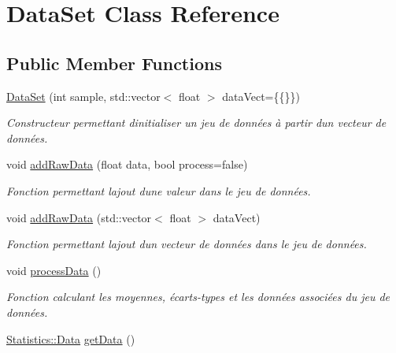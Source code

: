\hypertarget{classDataSet}{}\section{Data\+Set Class Reference}
\label{classDataSet}
\subsection*{Public Member Functions}
\begin{DoxyCompactItemize}
\item 
\hyperlink{classDataSet_ab45c95dc19f12a9217c0f3da7ac92b6a}{Data\+Set} (int sample, std\+::vector$<$ float $>$ data\+Vect=\{\{\}\})
\begin{DoxyCompactList}\small\item\em Constructeur permettant d\textquotesingle{}initialiser un jeu de données à partir d\textquotesingle{}un vecteur de données. \end{DoxyCompactList}\item 
void \hyperlink{classDataSet_ac2453c8cd424ed33b941363a45c009f8}{add\+Raw\+Data} (float data, bool process=false)
\begin{DoxyCompactList}\small\item\em Fonction permettant l\textquotesingle{}ajout d\textquotesingle{}une valeur dans le jeu de données. \end{DoxyCompactList}\item 
void \hyperlink{classDataSet_a71cfe353100966c9bdfb1f6880075691}{add\+Raw\+Data} (std\+::vector$<$ float $>$ data\+Vect)
\begin{DoxyCompactList}\small\item\em Fonction permettant l\textquotesingle{}ajout d\textquotesingle{}un vecteur de données dans le jeu de données. \end{DoxyCompactList}\item 
void \hyperlink{classDataSet_a6e174dbffadb1a262c6cc92781d0bd12}{process\+Data} ()
\begin{DoxyCompactList}\small\item\em Fonction calculant les moyennes, écarts-\/types et les données associées du jeu de données. \end{DoxyCompactList}\item 
\mbox{\label{classDataSet_af646e5b745734c1b18f2e90117e1d3c1}} 
\hyperlink{structStatistics_1_1Data}{Statistics\+::\+Data} \hyperlink{classDataSet_af646e5b745734c1b18f2e90117e1d3c1}{get\+Data} ()

\end{DoxyCompactItemize}
